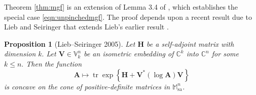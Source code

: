 \documentclass[11pt,letterpaper,twoside,reqno,nosumlimits]{amsart}
\renewcommand{\star}{*}
\newcommand{\mat}[1]{\ensuremath{\bm{#1}}} %
\newcommand{\e}{\ensuremath{\mathrm{e}}}
\newcommand{\E}{\ensuremath{\mathbb{E}}}
\newcommand{\C}{\ensuremath{\mathbb{C}}}
\newcommand{\Isom}[2]{\ensuremath{\mathbb{V}_{#1}^{#2}}}
\newcommand{\samats}[1]{\ensuremath{\mathbb{M}^{#1}_{\mathrm{sa}}}}
\DeclareMathOperator{\tr}{tr}
\newcommand{\trexp}[1]{\ensuremath{\tr\exp\left\{#1\right\}}}
\newtheorem{prop}{Proposition}
\newtheorem{cor}[thm]{Corollary}
\theoremstyle{remark}
\numberwithin{equation}{section}
\numberwithin{thm}{section}
\numberwithin{prop}{section}
\numberwithin{defn}{section}
\numberwithin{remark}{section}
\begin{document}



Theorem \ref{thm:mgf} is an extension of Lemma 3.4 of \cite{T10a}, which establishes the special case \eqref{eqn:unpinchedmgf}. The proof depends upon a recent result due to Lieb and Seiringer \cite[Thm.~3]{LS05} that extends Lieb's earlier result \cite[Thm.~6]{Lieb1973}.

\begin{prop}[Lieb--Seiringer 2005]
Let $\mat{H}$ be a self-adjoint matrix with dimension $k.$ Let $\mat{V} \in \Isom{k}{n}$ be an isometric embedding of $\C^k$ into $\C^n$ for some $k \leq n.$ Then the function
\begin{equation*}
 \mat{A} \longmapsto \trexp{\mat{H} + \mat{V}^\star (\log\mat{A}) \mat{V}}
\end{equation*}
is concave on the cone of positive-definite matrices in \samats{n}.
 \label{prop:pinchedtracefunctional}
\end{prop}
\end{document}
